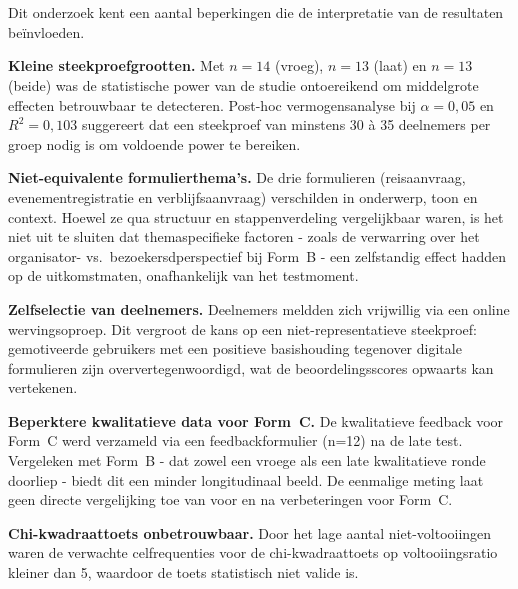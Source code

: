 \section{}

Dit onderzoek kent een aantal beperkingen die de interpretatie van de resultaten beïnvloeden.

\textbf{Kleine steekproefgrootten.} Met $n = 14$ (vroeg), $n = 13$ (laat) en $n = 13$ (beide) was de statistische power van de studie ontoereikend om middelgrote effecten betrouwbaar te detecteren. Post-hoc vermogensanalyse bij $\alpha = 0{,}05$ en $R^2 = 0{,}103$ suggereert dat een steekproef van minstens 30 à 35 deelnemers per groep nodig is om voldoende power te bereiken.

\textbf{Niet-equivalente formulierthema's.} De drie formulieren (reisaanvraag, evenementregistratie en verblijfsaanvraag) verschilden in onderwerp, toon en context. Hoewel ze qua structuur en stappenverdeling vergelijkbaar waren, is het niet uit te sluiten dat themaspecifieke factoren - zoals de verwarring over het organisator- vs.\ bezoekersdperspectief bij Form~B - een zelfstandig effect hadden op de uitkomstmaten, onafhankelijk van het testmoment.

\textbf{Zelfselectie van deelnemers.} Deelnemers meldden zich vrijwillig via een online wervingsoproep. Dit vergroot de kans op een niet-representatieve steekproef: gemotiveerde gebruikers met een positieve basishouding tegenover digitale formulieren zijn oververtegenwoordigd, wat de beoordelingsscores opwaarts kan vertekenen.

\textbf{Beperktere kwalitatieve data voor Form~C.} De kwalitatieve feedback voor Form~C werd verzameld via een feedbackformulier (n=12) na de late test. Vergeleken met Form~B - dat zowel een vroege als een late kwalitatieve ronde doorliep - biedt dit een minder longitudinaal beeld. De eenmalige meting laat geen directe vergelijking toe van voor en na verbeteringen voor Form~C.

\textbf{Chi-kwadraattoets onbetrouwbaar.} Door het lage aantal niet-voltooiingen waren de verwachte celfrequenties voor de chi-kwadraattoets op voltooiingsratio kleiner dan 5, waardoor de toets statistisch niet valide is.

\section{}

